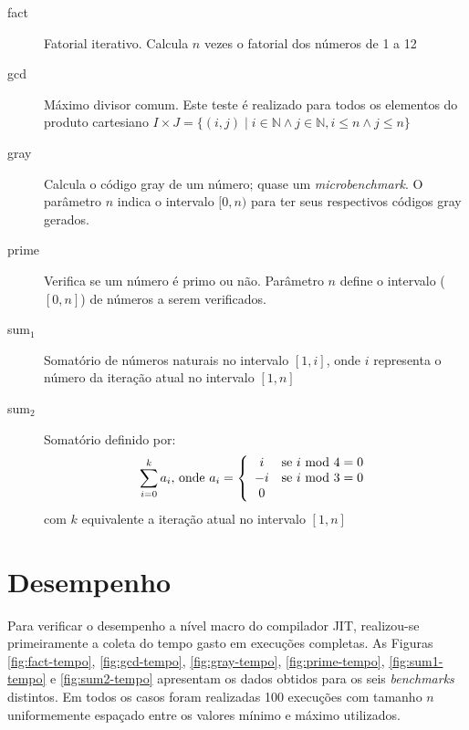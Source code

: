 \begin{description}
\item[fact] Fatorial iterativo. Calcula $n$ vezes o fatorial dos
  números de 1 a 12
\item[gcd] Máximo divisor comum. Este teste é realizado
  para todos os elementos do produto cartesiano
 $I \times J = \{(i, j) \mid i \in \mathbb{N} \wedge j \in \mathbb{N},
 i \le n \wedge j \le n\}$
\item[gray] Calcula o código gray \cite{graycode} de um número;
  quase um \textit{microbenchmark}. O parâmetro $n$ indica o
  intervalo $[0, n)$ para ter seus respectivos códigos gray gerados.
\item[prime] Verifica se um número é primo ou não. Parâmetro $n$
  define o intervalo ($[0, n]$) de números a serem verificados.
\item[sum$_1$] Somatório de números naturais no intervalo
 $[1, i]$, onde $i$ representa o número da iteração atual no intervalo
 $[1, n]$
\item[sum$_2$] Somatório definido por:
\[ \sum_{i=0}^k a_i\mbox{, onde } a_i = \left\{
    \begin{array}{c l}
      i & \mbox{se } i \mbox{ mod } 4 = 0 \\
      -i & \mbox{se } i \mbox{ mod } 3 = 0 \\
      0
    \end{array}
  \right.
\] com $k$ equivalente a iteração atual no intervalo $[1, n]$
\end{description}


\section{Desempenho}

Para verificar o desempenho a nível macro do compilador JIT,
realizou-se primeiramente a coleta do tempo gasto em execuções
completas. As Figuras
\ref{fig:fact-tempo}, \ref{fig:gcd-tempo}, \ref{fig:gray-tempo},
\ref{fig:prime-tempo}, \ref{fig:sum1-tempo} e \ref{fig:sum2-tempo}
apresentam os dados obtidos para os seis \textit{benchmarks}
distintos. Em todos os casos foram realizadas 100 execuções com tamanho
$n$ uniformemente espaçado entre os valores mínimo e máximo utilizados.

